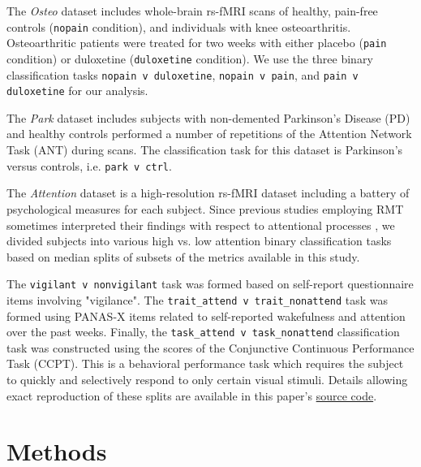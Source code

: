 \documentclass[12pt]{spieman}  %
\newcommand{\code}[1]{\small\texttt{#1}\normalsize}
\begin{document}
\begin{spacing}{2}
The \textit{Osteo} dataset\cite{tetreaultBrainConnectivityPredicts2016}
includes whole-brain rs-fMRI scans of healthy, pain-free controls
(\code{nopain} condition), and individuals with knee osteoarthritis.
Osteoarthritic patients were treated for two weeks with either placebo
(\code{pain} condition) or duloxetine (\code{duloxetine} condition).
We use the three binary classification tasks \code{nopain v duloxetine},
\code{nopain v pain}, and \code{pain v duloxetine} for our analysis.

The \textit{Park} dataset\cite{madhyasthaDynamicConnectivityRest2015} includes
subjects with non-demented Parkinson's Disease (PD) and
healthy controls performed a number of repetitions of the Attention Network
Task (ANT\cite{fanActivationAttentionalNetworks2005}) during scans.
The classification task for this dataset is Parkinson's versus controls, i.e.
\code{park v ctrl}.

The \textit{Attention} dataset\cite{gorgolewskiHighResolution7Tesla2015} is a
high-resolution rs-fMRI dataset including a battery of psychological measures
for each subject. Since previous studies employing RMT sometimes interpreted
their findings with respect to attentional processes
\cite{wangRandomMatrixTheory2016,matharooSpontaneousBackpainAlters2020}, we
divided subjects into various high vs. low attention binary classification
tasks based on median splits of subsets of the metrics available in this study.

The \code{vigilant v nonvigilant} task was formed based on self-report
questionnaire items involving
"vigilance"\cite{gorgolewskiCorrespondenceIndividualDifferences2014}. The
\code{trait\_attend v trait\_nonattend} task was formed using PANAS-X
\cite{watsonPANASXManualPositive1994} items related to self-reported
wakefulness and attention over the past weeks. Finally, the
\code{task\_attend v task\_nonattend} classification task was constructed
using the scores of the Conjunctive Continuous Performance Task
(CCPT\cite{shalevConjunctiveContinuousPerformance2011}). This is a behavioral
performance task which requires the subject to quickly and selectively respond
to only certain visual stimuli. Details allowing exact reproduction of these
splits are available in this paper's
\href{https://github.com/DM-Berger/random-matrix-fmri/blob/master/code/rmt/preprocess/unify\_attention\_data.py}{source
code}.



\section{Methods}
\label{sec:methods}


\end{spacing}
\end{document}
